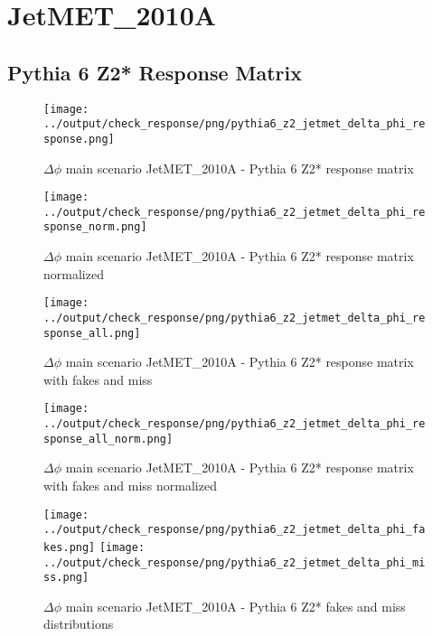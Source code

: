 \documentclass[11pt]{book}
\begin{document}
\clearpage
\section{JetMET\_2010A}
\subsection{Pythia 6 Z2* Response Matrix}

\begin{figure}[ht]
\centering
\texttt{[image: ../output/check\_response/png/pythia6\_z2\_jetmet\_delta\_phi\_response.png]}
\caption{$\Delta\phi$ main scenario JetMET\_2010A - Pythia 6 Z2* response matrix}
\label{p6_jetmet_delta_phi_response}
\end{figure}

\begin{figure}[ht]
\centering
\texttt{[image: ../output/check\_response/png/pythia6\_z2\_jetmet\_delta\_phi\_response\_norm.png]}
\caption{$\Delta\phi$ main scenario JetMET\_2010A - Pythia 6 Z2* response matrix normalized}
\label{p6_jetmet_delta_phi_response_norm}
\end{figure}

\begin{figure}[ht]
\centering
\texttt{[image: ../output/check\_response/png/pythia6\_z2\_jetmet\_delta\_phi\_response\_all.png]}
\caption{$\Delta\phi$ main scenario JetMET\_2010A - Pythia 6 Z2* response matrix with fakes and miss}
\label{p6_jetmet_delta_phi_response_all}
\end{figure}

\begin{figure}[ht]
\centering
\texttt{[image: ../output/check\_response/png/pythia6\_z2\_jetmet\_delta\_phi\_response\_all\_norm.png]}
\caption{$\Delta\phi$ main scenario JetMET\_2010A - Pythia 6 Z2* response matrix with fakes and miss normalized}
\label{p6_jetmet_delta_phi_response_all_norm}
\end{figure}

\begin{figure}[ht]
\centering
\texttt{[image: ../output/check\_response/png/pythia6\_z2\_jetmet\_delta\_phi\_fakes.png]}
\texttt{[image: ../output/check\_response/png/pythia6\_z2\_jetmet\_delta\_phi\_miss.png]}
\caption{$\Delta\phi$ main scenario JetMET\_2010A - Pythia 6 Z2* fakes and miss distributions}
\label{p6_jetmet_delta_phi_fakesmiss}
\end{figure}
\end{document}
